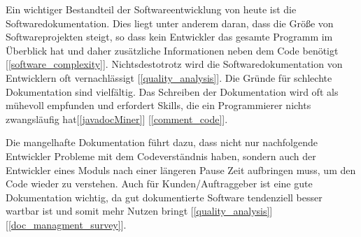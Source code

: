 \label{sec:introduction}

Ein wichtiger Bestandteil der Softwareentwicklung von heute ist die Softwaredokumentation. Dies liegt unter anderem daran, dass die Größe von Softwareprojekten steigt, so dass kein Entwickler das gesamte Programm im Überblick hat und daher zusätzliche Informationen neben dem Code benötigt [\ref{software_complexity}]. Nichtsdestotrotz wird die Softwaredokumentation von Entwicklern oft vernachlässigt [\ref{quality_analysis}].  Die Gründe für schlechte Dokumentation sind vielfältig. Das Schreiben der Dokumentation wird oft als mühevoll empfunden und erfordert Skills, die ein Programmierer nichts zwangsläufig hat[\ref{javadocMiner}] [\ref{comment_code}].  

Die mangelhafte Dokumentation führt dazu, dass nicht nur nachfolgende Entwickler Probleme mit dem Codeverständnis haben, sondern auch der Entwickler eines Moduls nach einer längeren Pause Zeit aufbringen muss, um den Code wieder zu verstehen. Auch für Kunden/Auftraggeber ist eine gute Dokumentation wichtig, da gut dokumentierte Software tendenziell besser wartbar ist und somit mehr Nutzen bringt [\ref{quality_analysis}][\ref{doc_managment_survey}].